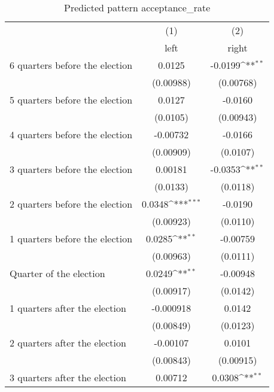 \begin{table}[htbp]\centering
\def\sym#1{\ifmmode^{#1}\else\(^{#1}\)\fi}
\caption{Predicted pattern acceptance\_rate}
\begin{tabular}{l*{2}{c}}
\hline\hline
                    &\multicolumn{1}{c}{(1)}&\multicolumn{1}{c}{(2)}\\
                    &\multicolumn{1}{c}{left}&\multicolumn{1}{c}{right}\\
\hline
 6 quarters before the election&      0.0125         &     -0.0199\sym{**} \\
                    &   (0.00988)         &   (0.00768)         \\
[1em]
 5 quarters before the election&      0.0127         &     -0.0160         \\
                    &    (0.0105)         &   (0.00943)         \\
[1em]
 4 quarters before the election&    -0.00732         &     -0.0166         \\
                    &   (0.00909)         &    (0.0107)         \\
[1em]
 3 quarters before the election&     0.00181         &     -0.0353\sym{**} \\
                    &    (0.0133)         &    (0.0118)         \\
[1em]
 2 quarters before the election&      0.0348\sym{***}&     -0.0190         \\
                    &   (0.00923)         &    (0.0110)         \\
[1em]
 1 quarters before the election&      0.0285\sym{**} &    -0.00759         \\
                    &   (0.00963)         &    (0.0111)         \\
[1em]
Quarter of the election&      0.0249\sym{**} &    -0.00948         \\
                    &   (0.00917)         &    (0.0142)         \\
[1em]
 1 quarters after the election&   -0.000918         &      0.0142         \\
                    &   (0.00849)         &    (0.0123)         \\
[1em]
 2 quarters after the election&    -0.00107         &      0.0101         \\
                    &   (0.00843)         &   (0.00915)         \\
[1em]
 3 quarters after the election&     0.00712         &      0.0308\sym{**} \\

\end{tabular}
\end{table}
